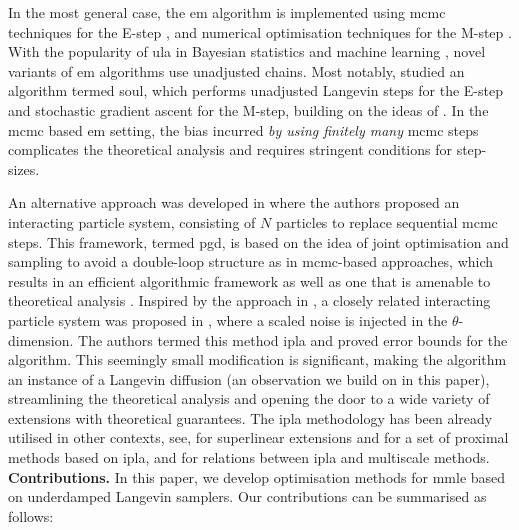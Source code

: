 In the most general case, the \gls*{em} algorithm is implemented using \gls*{mcmc} techniques for the E-step \citep{atchade2017}, and numerical optimisation techniques for the M-step \citep{meng1993maximum,liu1994ecme,lange1995gradient}. With the popularity of \gls*{ula} in Bayesian statistics and machine learning \citep{durmus2017nonasymptotic,durmus2019high,dalalyan2017theoretical}, novel variants of \gls*{em} algorithms use unadjusted chains. Most notably, \citep{de2021efficient} studied an algorithm termed \gls*{soul}, which performs unadjusted Langevin steps for the E-step and stochastic gradient ascent for the M-step, building on the ideas of \citep{atchade2017}. In the \gls*{mcmc} based \gls*{em} setting, the bias incurred \emph{by using finitely many} \gls*{mcmc} steps complicates the theoretical analysis and requires stringent conditions for step-sizes.

An alternative approach was developed in \citep{kuntz2023particle} where the authors proposed an interacting particle system, consisting of $N$ particles to replace sequential \gls*{mcmc} steps. This framework, termed \gls*{pgd}, is based on the idea of joint optimisation and sampling to avoid a double-loop structure as in \gls*{mcmc}-based approaches, which results in an efficient algorithmic framework as well as one that is amenable to theoretical analysis \citep{caprio2024error}. Inspired by the approach in \citep{kuntz2023particle}, a closely related interacting particle system was proposed in \citep{akyildiz2025interacting}, where a scaled noise is injected in the $\theta$-dimension. The authors termed this method \gls*{ipla} and proved error bounds for the algorithm. This seemingly small modification is significant, making the algorithm an instance of a Langevin diffusion (an observation we build on in this paper), streamlining the theoretical analysis and opening the door to a wide variety of extensions with theoretical guarantees. The \gls*{ipla} methodology has been already utilised in other contexts, see, \citep{johnston2024taming} for superlinear extensions and \citep{encinar2025proximal} for a set of proximal methods based on \gls*{ipla}, and \citep{akyildiz2024multiscale} for relations between \gls*{ipla} and multiscale methods. \\

\noindent\textbf{Contributions.} In this paper, we develop optimisation methods for \gls*{mmle} based on underdamped Langevin samplers. Our contributions can be summarised as follows: \\

